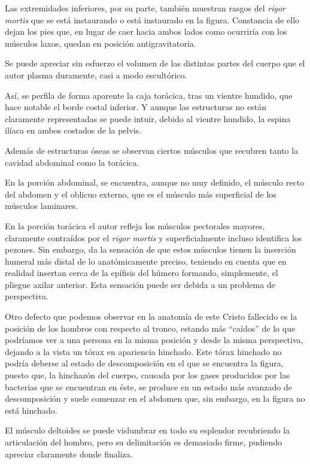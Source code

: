Las extremidades inferiores, por su parte, también muestran rasgos del \textit{rigor mortis} que se está instaurando o está instaurado en la figura. Constancia de ello dejan los pies que, en lugar de caer hacia ambos lados como ocurriría con los músculos laxos, quedan en posición antigravitatoria.

Se puede apreciar sin esfuerzo el volumen de las distintas partes del cuerpo que el autor plasma duramente, casi a modo escultórico.

Así, se perfila de forma aparente la caja torácica, tras un vientre hundido, que hace notable el borde costal inferior. Y aunque las estructuras no están claramente representadas se puede intuir, debido al vientre hundido, la espina ilíaca en ambos costados de la pelvis.

Además de estructuras óseas se observan ciertos músculos que recubren tanto la cavidad abdominal como la torácica.

En la porción abdominal, se encuentra, aunque no muy definido, el músculo recto del abdomen y el oblicuo externo, que es el músculo más superficial de los músculos laminares.

En la porción torácica el autor refleja los músculos pectorales mayores, claramente contraídos por el \textit{rigor mortis} y superficialmente incluso identifica los pezones. Sin embargo, da la sensación de que estos músculos tienen la inserción humeral más distal de lo anatómicamente preciso, teniendo en cuenta que en realidad insertan cerca de la epífisis del húmero formando, simplemente, el pliegue axilar anterior. Esta sensación puede ser debida a un problema de perspectiva. 

Otro defecto que podemos observar en la anatomía de este Cristo fallecido es la posición de los hombros con respecto al tronco, estando más ``caídos'' de lo que podríamos ver a una persona en la misma posición y desde la misma perspectiva, dejando a la vista un tórax en apariencia hinchado. Este tórax hinchado no podría deberse al estado de descomposición en el que se encuentra la figura, puesto que, la hinchazón del cuerpo, causada por los gases producidos por las bacterias que se encuentran en éste, se produce en un estado más avanzado de descomposición y suele comenzar  en el abdomen que, sin embargo, en la figura no está hinchado.

El músculo deltoides se puede vislumbrar en todo su esplendor recubriendo la articulación del hombro, pero su delimitación es demasiado firme, pudiendo apreciar claramente donde finaliza.

